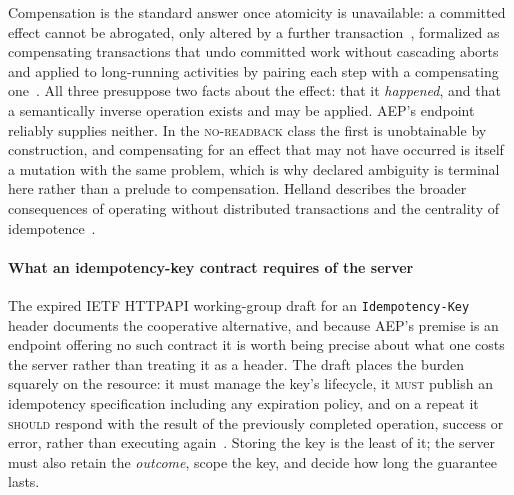 Compensation is the standard answer once atomicity is unavailable: a
committed effect cannot be abrogated, only altered by a further
transaction~\cite{gray1981transaction}, formalized as compensating transactions
that undo committed work without cascading aborts~\cite{korth1990compensating}
and applied to long-running activities by pairing each step with a compensating
one~\cite{garciamolina1987sagas}. All three presuppose two facts about the
effect: that it \emph{happened}, and that a semantically inverse operation
exists and may be applied. AEP's endpoint reliably supplies neither. In the
\textsc{no-readback} class the first is unobtainable by construction, and
compensating for an effect that may not have occurred is itself a mutation with
the same problem, which is why declared ambiguity is terminal here rather
than a prelude to compensation. Helland describes the broader consequences of
operating without distributed transactions and the centrality of
idempotence~\cite{helland2007apostate,helland2012idempotence}.

\paragraph{What an idempotency-key contract requires of the server} The expired
IETF HTTPAPI working-group draft for an \texttt{Idempotency-Key} header
documents the cooperative alternative, and because AEP's premise is an endpoint
offering no such contract it is worth being precise about what one costs the
server rather than treating it as a header. The draft places the burden squarely
on the resource: it must manage the key's lifecycle, it \textsc{must} publish an
idempotency specification including any expiration policy, and on a repeat it
\textsc{should} respond with the result of the previously completed operation,
success or error, rather than executing
again~\cite{jena2025idempotencykey}. Storing the key is the least of it; the
server must also retain the \emph{outcome}, scope the key, and decide how long
the guarantee lasts.

